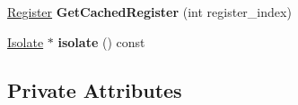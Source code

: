 \begin{DoxyCompactItemize}
\item 
\hyperlink{structv8_1_1internal_1_1_register}{Register} {\bfseries Get\+Cached\+Register} (int register\+\_\+index)\hypertarget{classv8_1_1internal_1_1_reg_exp_macro_assembler_a_r_m64_a6b8fe869065be06280a224739c9ce2b5}{}\label{classv8_1_1internal_1_1_reg_exp_macro_assembler_a_r_m64_a6b8fe869065be06280a224739c9ce2b5}

\item 
\hyperlink{classv8_1_1internal_1_1_isolate}{Isolate} $\ast$ {\bfseries isolate} () const \hypertarget{classv8_1_1internal_1_1_reg_exp_macro_assembler_a_r_m64_ac2c870399dcec76d45ee3f256def82c8}{}\label{classv8_1_1internal_1_1_reg_exp_macro_assembler_a_r_m64_ac2c870399dcec76d45ee3f256def82c8}

\end{DoxyCompactItemize}
\subsection*{Private Attributes}
